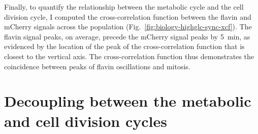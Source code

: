 Finally, to quantify the relationship between the metabolic cycle and the cell division cycle, I computed the cross-correlation function between the flavin and mCherry signals across the population (Fig.\ \ref{fig:biology-highglc-sync-xcf}).
The flavin signal peaks, on average, precede the mCherry signal peaks by \SI{5}{\minute}, as evidenced by the location of the peak of the cross-correlation function that is closest to the vertical axis.
The cross-correlation function thus demonstrates the coincidence between peaks of flavin oscillations and mitosis.


\section{Decoupling between the metabolic and cell division cycles}
\label{sec:biology-abrupt}

